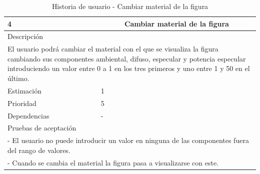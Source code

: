 \begin{table}[H]
	\begin{center}
		\begin{tabular} {|l|c|l|}
			\hline
			4 & \multicolumn{2}{c|}{Cambiar material de la figura} \\ \hline \hline
			\multicolumn{3}{|l|}{Descripción} \\ \hline
			\multicolumn{3}{|p{12cm}|}{El usuario podrá cambiar el material con el que se visualiza la figura cambiando sus componentes ambiental, difuso, especular y potencia especular introduciendo un valor entre 0 a 1 en los tres primeros y uno entre 1 y 50 en el último.} \\ \hline
			\multicolumn{2}{|l|}{Estimación} & 1 \\ \hline
			\multicolumn{2}{|l|}{Prioridad} & 5 \\ \hline
			\multicolumn{2}{|l|}{Dependencias} & - \\ \hline
			\multicolumn{3}{|l|}{Pruebas de aceptación} \\ \hline
			\multicolumn{3}{|p{12cm}|}{ - El usuario no puede introducir un valor en ninguna de las componentes fuera del rango de valores.} \\
			\multicolumn{3}{|p{12cm}|}{ - Cuando se cambia el material la figura pasa a visualizarse con este.} \\ \hline
		\end{tabular}
	\end{center}
	\caption{Historia de usuario - Cambiar material de la figura}
	\label{tab:hu_cambiar_material_de_la_figura}
\end{table}


